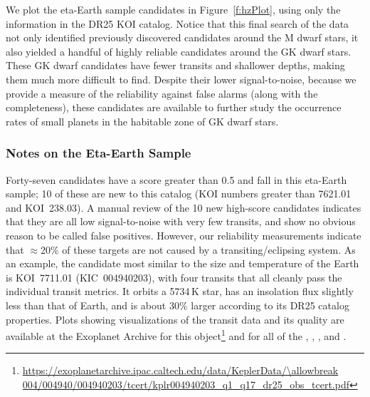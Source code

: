 
We plot the eta-Earth sample candidates in Figure~\ref{f:hzPlot}, using only the information in the DR25 KOI catalog. Notice that this final search of the \Kepler{} data not only identified previously discovered candidates around the M dwarf stars, it also yielded a handful of highly reliable candidates around the GK dwarf stars. These GK dwarf candidates have fewer transits and shallower depths, making them much more difficult to find.  Despite their lower signal-to-noise, because we provide a measure of the reliability against false alarms (along with the completeness), these candidates are available to further study the occurrence rates of small planets in the habitable zone of GK dwarf stars.


\subsubsection{Notes on the Eta-Earth Sample}
Forty-seven candidates have a score greater than 0.5 and fall in this eta-Earth sample; 10 of these are new to this catalog (KOI numbers greater than 7621.01 and KOI~238.03).  A manual review of the 10 new high-score candidates indicates that they are all low signal-to-noise with very few transits, and show no obvious reason to be called false positives. However, our reliability measurements indicate that $\approx$20\% of these targets are not caused by a transiting/eclipsing system. As an example, the candidate most similar to the size and temperature of the Earth is KOI~7711.01 (KIC~004940203), with four transits that all cleanly pass the individual transit metrics. It orbits a 5734\,K star, has an insolation flux slightly less than that of Earth, and is about 30\% larger according to its DR25 catalog properties.  Plots showing visualizations of the transit data and its quality are available at the Exoplanet Archive for this object\footnote{\url{https://exoplanetarchive.ipac.caltech.edu/data/KeplerData/\allowbreak 004/004940/004940203/tcert/kplr004940203\_q1\_q17\_dr25\_obs\_tcert.pdf}} and for all of the , , , and .


